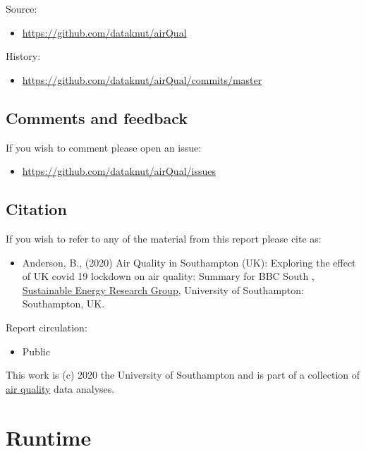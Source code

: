 \documentclass[]{article}
\providecommand{\tightlist}{%
  \setlength{\itemsep}{0pt}\setlength{\parskip}{0pt}}
\begin{document}
Source:

\begin{itemize}
\tightlist
\item
  \url{https://github.com/dataknut/airQual}
\end{itemize}

History:

\begin{itemize}
\tightlist
\item
  \url{https://github.com/dataknut/airQual/commits/master}
\end{itemize}

\subsection{Comments and feedback}\label{comments-and-feedback}

If you wish to comment please open an issue:

\begin{itemize}
\tightlist
\item
  \url{https://github.com/dataknut/airQual/issues}
\end{itemize}

\subsection{Citation}\label{citation}

If you wish to refer to any of the material from this report please cite
as:

\begin{itemize}
\tightlist
\item
  Anderson, B., (2020) Air Quality in Southampton (UK): Exploring the
  effect of UK covid 19 lockdown on air quality: Summary for BBC South ,
  \href{http://www.energy.soton.ac.uk}{Sustainable Energy Research
  Group}, University of Southampton: Southampton, UK.
\end{itemize}

Report circulation:

\begin{itemize}
\tightlist
\item
  Public
\end{itemize}

This work is (c) 2020 the University of Southampton and is part of a
collection of \href{https://dataknut.github.io/airQual/}{air quality}
data analyses.

\section{Runtime}\label{runtime}
\end{document}
